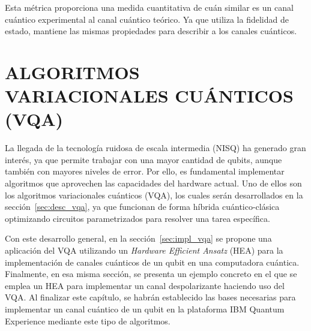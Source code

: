 \documentclass[letterpaper,12pt]{thesisECFM}
\theoremstyle{plain}
\theoremstyle{definition}
\theoremstyle{definition}
\theoremstyle{remark}
\newcommand{\1}{\mathbb{1}}
\begin{document}
Esta métrica proporciona una medida cuantitativa de cuán similar es un canal cuántico experimental al canal cuántico teórico. Ya que utiliza la fidelidad de estado, mantiene las mismas propiedades para describir a los canales cuánticos. 

\chapter{ALGORITMOS VARIACIONALES CUÁNTICOS (VQA)} %
La llegada de la tecnología ruidosa de escala intermedia (NISQ) ha generado
gran interés, ya que permite trabajar con una mayor cantidad de qubits, aunque
también con mayores niveles de error. Por ello, es fundamental implementar
algoritmos que aprovechen las capacidades del hardware actual. Uno de ellos
son los algoritmos variacionales cuánticos (VQA), los cuales serán
desarrollados en la sección~\ref{sec:desc_vqa}, ya que funcionan de forma
híbrida cuántico-clásica optimizando circuitos parametrizados para resolver
una tarea específica.

Con este desarrollo general, en la sección~\ref{sec:impl_vqa} se propone una
aplicación del VQA utilizando un \textit{Hardware Efficient Ansatz} (HEA) para
la implementación de canales cuánticos de un qubit en una computadora cuántica.
Finalmente, en esa misma sección, se presenta un ejemplo concreto en el que se
emplea un HEA para implementar un canal despolarizante haciendo uso del VQA. Al
finalizar este capítulo, se habrán establecido las bases necesarias para
implementar un canal cuántico de un qubit en la plataforma IBM Quantum
Experience mediante este tipo de algoritmos.

\end{document}
